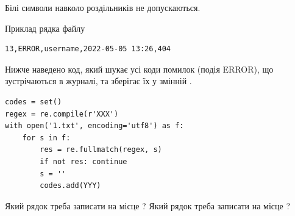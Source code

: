 \documentclass[12pt, ukrainian]{article}
\begin{document}
{Білі символи навколо роздільників не допускаються.

Приклад рядка файлу



\begin{verbatim}
13,ERROR,username,2022-05-05 13:26,404
\end{verbatim}


Нижче наведено код, який шукає усі коди помилок (подія ERROR), що зустріча\-ють\-ся в журналі, та зберігає їх у змінній .



\begin{verbatim}
codes = set()
regex = re.compile(r'XXX')
with open('1.txt', encoding='utf8') as f:
    for s in f:
        res = re.fullmatch(regex, s)
        if not res: continue
        s = ''
        codes.add(YYY)
\end{verbatim}



Який рядок треба записати на місце  ?
Який рядок треба записати на місце  ?\par

}
\end{document}
